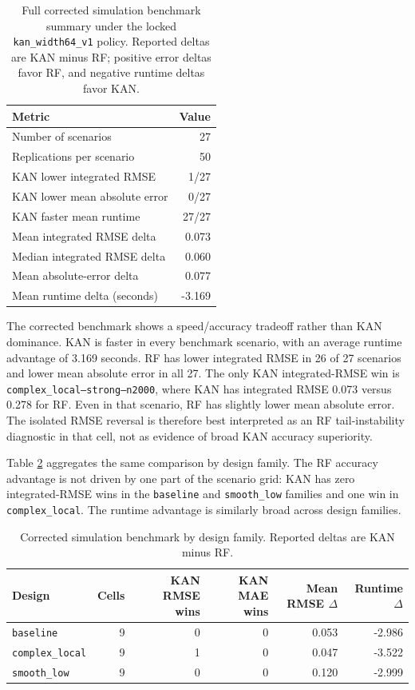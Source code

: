 \documentclass[final,3p,fleqn, 10pt]{elsarticle}
\begin{document}
\begin{table}[htbp]
\centering
\caption{Full corrected simulation benchmark summary under the locked \texttt{kan\_width64\_v1} policy. Reported deltas are KAN minus RF; positive error deltas favor RF, and negative runtime deltas favor KAN.}
\label{tab:sim_results_summary_dgp1}
\begin{tabular}{@{}lr@{}}
\toprule
Metric & Value \\
\midrule
Number of scenarios & 27 \\
Replications per scenario & 50 \\
KAN lower integrated RMSE & 1/27 \\
KAN lower mean absolute error & 0/27 \\
KAN faster mean runtime & 27/27 \\
Mean integrated RMSE delta & 0.073 \\
Median integrated RMSE delta & 0.060 \\
Mean absolute-error delta & 0.077 \\
Mean runtime delta (seconds) & -3.169 \\
\bottomrule
\end{tabular}
\end{table}

The corrected benchmark shows a speed/accuracy tradeoff rather than KAN dominance. KAN is faster in every benchmark scenario, with an average runtime advantage of 3.169 seconds. RF has lower integrated RMSE in 26 of 27 scenarios and lower mean absolute error in all 27. The only KAN integrated-RMSE win is \texttt{complex\_local--strong--n2000}, where KAN has integrated RMSE 0.073 versus 0.278 for RF. Even in that scenario, RF has slightly lower mean absolute error. The isolated RMSE reversal is therefore best interpreted as an RF tail-instability diagnostic in that cell, not as evidence of broad KAN accuracy superiority.

Table \ref{tab:sim_panel_summary} aggregates the same comparison by design family. The RF accuracy advantage is not driven by one part of the scenario grid: KAN has zero integrated-RMSE wins in the \texttt{baseline} and \texttt{smooth\_low} families and one win in \texttt{complex\_local}. The runtime advantage is similarly broad across design families.

\begin{table}[htbp]
\centering
\caption{Corrected simulation benchmark by design family. Reported deltas are KAN minus RF.}
\label{tab:sim_panel_summary}
\small
\begin{tabular}{@{}lrrrrr@{}}
\toprule
Design & Cells & KAN RMSE wins & KAN MAE wins & Mean RMSE $\Delta$ & Runtime $\Delta$ \\
\midrule
\texttt{baseline} & 9 & 0 & 0 & 0.053 & -2.986 \\
\texttt{complex\_local} & 9 & 1 & 0 & 0.047 & -3.522 \\
\texttt{smooth\_low} & 9 & 0 & 0 & 0.120 & -2.999 \\
\bottomrule
\end{tabular}
\end{table}
\end{document}
